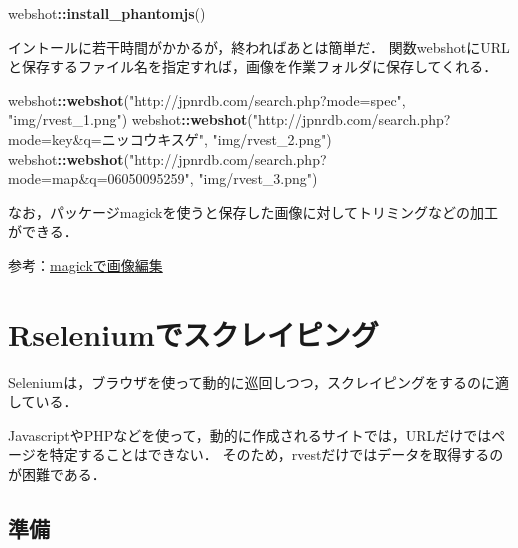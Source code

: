 \documentclass[
]{article}
\newenvironment{Shaded}{\begin{snugshade}}{\end{snugshade}}
\newcommand{\FunctionTok}[1]{\textcolor[rgb]{0.13,0.29,0.53}{\textbf{#1}}}
\newcommand{\NormalTok}[1]{#1}
\newcommand{\SpecialCharTok}[1]{\textcolor[rgb]{0.81,0.36,0.00}{\textbf{#1}}}
\newcommand{\StringTok}[1]{\textcolor[rgb]{0.31,0.60,0.02}{#1}}
\begin{document}
\begin{Shaded}
\begin{Highlighting}[]
\NormalTok{webshot}\SpecialCharTok{::}\FunctionTok{install\_phantomjs}\NormalTok{()}
\end{Highlighting}
\end{Shaded}

イントールに若干時間がかかるが，終わればあとは簡単だ．
関数webshotにURLと保存するファイル名を指定すれば，画像を作業フォルダに保存してくれる．

\begin{Shaded}
\begin{Highlighting}[]
\NormalTok{webshot}\SpecialCharTok{::}\FunctionTok{webshot}\NormalTok{(}\StringTok{"http://jpnrdb.com/search.php?mode=spec"}\NormalTok{, }\StringTok{"img/rvest\_1.png"}\NormalTok{)}
\NormalTok{webshot}\SpecialCharTok{::}\FunctionTok{webshot}\NormalTok{(}\StringTok{"http://jpnrdb.com/search.php?mode=key\&q=ニッコウキスゲ"}\NormalTok{, }\StringTok{"img/rvest\_2.png"}\NormalTok{)}
\NormalTok{webshot}\SpecialCharTok{::}\FunctionTok{webshot}\NormalTok{(}\StringTok{"http://jpnrdb.com/search.php?mode=map\&q=06050095259"}\NormalTok{, }\StringTok{"img/rvest\_3.png"}\NormalTok{)}
\end{Highlighting}
\end{Shaded}

なお，パッケージmagickを使うと保存した画像に対してトリミングなどの加工ができる．

参考：\protect\hyperlink{magick}{magickで画像編集}

\hypertarget{rselenium}{%
\section{Rseleniumでスクレイピング}\label{rselenium}}

Seleniumは，ブラウザを使って動的に巡回しつつ，スクレイピングをするのに適している．

JavascriptやPHPなどを使って，動的に作成されるサイトでは，URLだけではページを特定することはできない．
そのため，rvestだけではデータを取得するのが困難である．

\hypertarget{ux6e96ux5099-11}{%
\subsection{準備}\label{ux6e96ux5099-11}}
\end{document}
